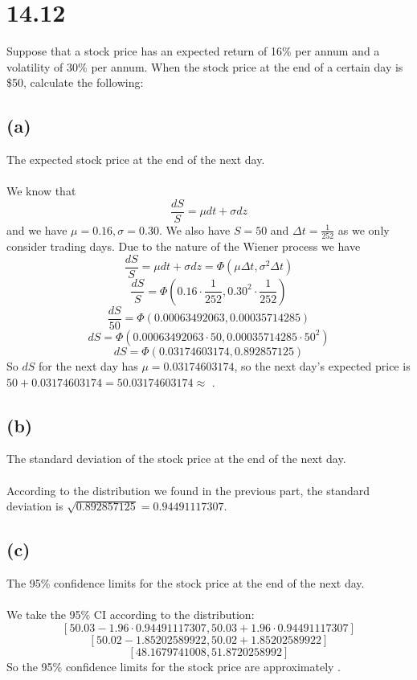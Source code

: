 \documentclass{article}
\begin{document}
{\Large 

\section*{14.12}
Suppose that a stock price has an expected return of 16\% per annum and a volatility of 30\% per annum. When the stock price at the end of a certain day is \$50, calculate the following:

\subsection*{(a)} 
The expected stock price at the end of the next day. \\ \\
We know that 
\[
  \frac{dS}{S} = \mu dt + \sigma dz
\]
and we have \(\mu = 0.16, \sigma = 0.30\). We also have \(S = 50\) and \(\Delta t = \frac{1}{252}\) as we only consider trading days. Due to the nature of the Wiener process we have 
\[
  \frac{dS}{S} = \mu dt + \sigma dz  = \Phi(\mu \Delta t, \sigma^2 \Delta t)
\]
\[
  \frac{dS}{S} = \Phi(0.16 \cdot \frac{1}{252}, 0.30^2 \cdot \frac{1}{252})
\]
\[
  \frac{dS}{50} = \Phi(0.00063492063, 0.00035714285)
\]
\[
  dS = \Phi(0.00063492063 \cdot 50, 0.00035714285 \cdot 50^2)
\]
\[
  dS = \Phi(0.03174603174, 0.892857125)
\]
So \(dS\) for the next day has \(\mu = 0.03174603174\), so the next day's expected price is \(50 + 0.03174603174 = 50.03174603174 \approx\) .

\subsection*{(b)}
The standard deviation of the stock price at the end of the next day. \\ \\
According to the distribution we found in the previous part, the standard deviation is \(\sqrt{0.892857125} = \boxed{\mathbf{0.94491117307}}\).

\subsection*{(c)}
The 95\% confidence limits for the stock price at the end of the next day. \\ \\
We take the 95\% CI according to the distribution:
\[
  [50.03 - 1.96 \cdot 0.94491117307, 50.03 + 1.96 \cdot 0.94491117307]
\]
\[
  [50.02 - 1.85202589922, 50.02 + 1.85202589922]
\]
\[
  [48.1679741008, 51.8720258992]
\]
So the 95\% confidence limits for the stock price are approximately \boxed{\textbf{[\$48.17, \$51.87]}}.

}
\end{document}
